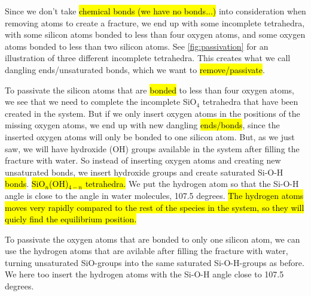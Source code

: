 Since we don't take \hl{chemical bonds (we have no bonds...)} into consideration when removing atoms to create a fracture, we end up with some incomplete tetrahedra, with some silicon atoms bonded to less than four oxygen atoms, and some oxygen atoms bonded to less than two silicon atoms. See \cref{fig:passivation} for an illustration of three different incomplete tetrahedra. This creates what we call dangling ends/unsaturated bonds, which we want to \hl{remove/passivate}.


To passivate the silicon atoms that are \hl{bonded} to less than four oxygen atoms, we see that we need to complete the incomplete SiO$_4$ tetrahedra that have been created in the system. But if we only insert oxygen atoms in the positions of the missing oxygen atoms, we end up with new dangling \hl{ends/bonds}, since the inserted oxygen atoms will only be bonded to one silicon atom. But, as we just saw, we will have hydroxide (OH) groups available in the system after filling the fracture with water. So instead of inserting oxygen atoms and creating new unsaturated bonds, we insert hydroxide groups and create saturated Si-O-H \hl{bonds}. \hl{ SiO$_n$(OH)$_{4-n}$ tetrahedra.} We put the hydrogen atom so that the Si-O-H angle is close to the angle in water molecules, 107.5 degrees. \hl{The hydrogen atoms moves very rapidly compared to the rest of the species in the system, so they will quicly find the equilibrium position.}

To passivate the oxygen atoms that are bonded to only one silicon atom, we can use the hydrogen atoms that are avilable after filling the fracture with water, turning unsaturated SiO-groups into the same saturated Si-O-H-groups as before. We here too insert the hydrogen atoms with the Si-O-H angle close to 107.5 degrees.

